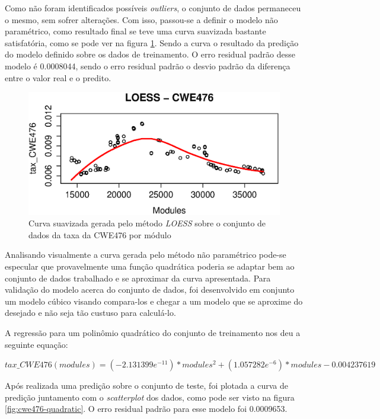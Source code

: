 Como não foram identificados possíveis \textit{outliers}, o conjunto de dados
permaneceu o mesmo, sem sofrer alterações. Com isso, passou-se a definir o
modelo não paramétrico, como resultado final se teve uma curva suavizada
bastante satisfatória, como se pode ver na figura \ref{fig:cwe476-loess}. Sendo
a curva o resultado da predição do modelo definido sobre os dados de
treinamento. O erro residual padrão desse modelo é 0.0008044, sendo o erro
residual padrão o desvio padrão da diferença entre o valor real e o predito.

\begin{figure}[h]
  \centering
  \includegraphics[width=1.0\textwidth]
      {figuras/cwe476-loess.eps}
      \caption{Curva suavizada gerada pelo método \textit{LOESS} sobre o
      conjunto de dados da taxa da CWE476 por módulo}
  \label{fig:cwe476-loess}
\end{figure}

Analisando visualmente a curva gerada pelo método não paramétrico pode-se
especular que provavelmente uma função quadrática poderia se adaptar bem ao
conjunto de dados trabalhado e se aproximar da curva apresentada. Para validação
do modelo acerca do conjunto de dados, foi desenvolvido em conjunto um modelo
cúbico visando compara-los e chegar a um modelo que se aproxime do desejado e
não seja tão custuso para calculá-lo. 

A regressão para um polinômio quadrático do conjunto de treinamento nos deu a
seguinte equação:

\begin{math}
 tax\_CWE476(modules) = (-2.131399e^{-11}) * modules^{2} + (1.057282e^{-6}) *
modules - 0.004237619 
\end{math}

Após realizada uma predição sobre o conjunto de teste, foi plotada a curva de
predição juntamento com o \textit{scatterplot} dos dados, como pode ser visto na
figura \ref{fig:cwe476-quadratic}. O erro residual padrão para esse modelo foi
0.0009653.

